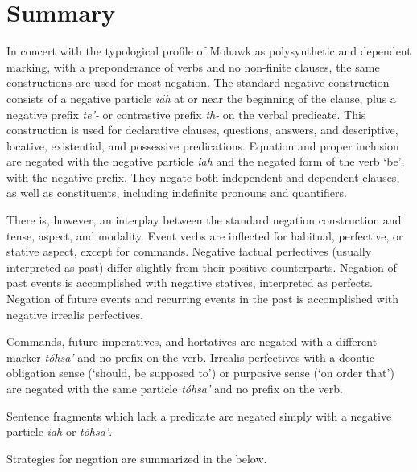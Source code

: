 \documentclass[output=paper,colorlinks,citecolor=brown]{langscibook}
\begin{document}
\section{Summary}

In concert with the typological profile of Mohawk as polysynthetic and dependent marking, with a preponderance of verbs and no non-finite clauses, the same constructions are used for most negation. The standard negative construction consists of a negative particle \textit{iáh} at or near the beginning of the clause, plus a negative prefix \textit{te’-} or contrastive prefix \textit{th-} on the verbal predicate. This construction is used for declarative clauses, questions, answers, and descriptive, locative, existential, and possessive predications. Equation and proper inclusion are negated with the negative particle \textit{iah} and the negated form of the verb ‘be’, with the negative prefix. They negate both independent and dependent clauses, as well as constituents, including indefinite pronouns and quantifiers.

There is, however, an interplay between the standard negation construction and tense, aspect, and modality. Event verbs are inflected for habitual, perfective, or stative aspect, except for commands. Negative factual perfectives (usually interpreted as past) differ slightly from their positive counterparts. Negation of past events is accomplished with negative statives, interpreted as perfects. Negation of future events and recurring events in the past is accomplished with negative irrealis perfectives. 

Commands, future imperatives, and hortatives are negated with a different marker \textit{tóhsa’} and no prefix on the verb. Irrealis perfectives with a deontic obligation sense (‘should, be supposed to’) or purposive sense (‘on order that’) are negated with the same particle \textit{tóhsa’} and no prefix on the verb.

Sentence fragments which lack a predicate are negated simply with a negative particle \textit{iah} or \textit{tóhsa’}. 

Strategies for negation are summarized in the  below.
\end{document}
